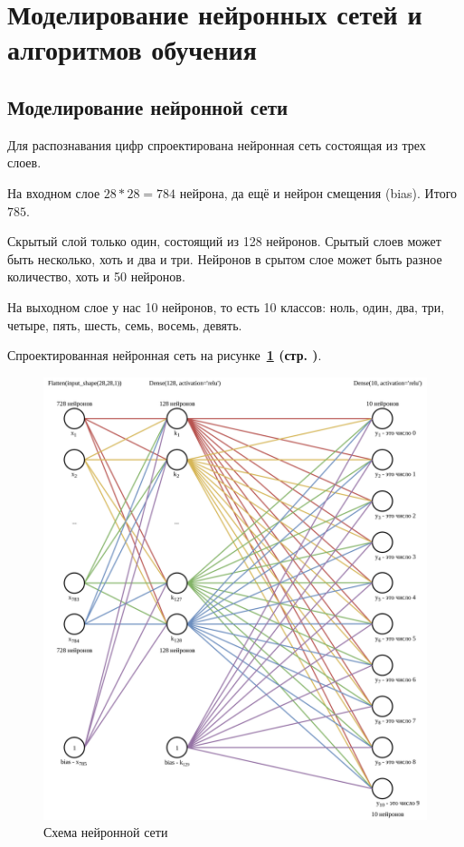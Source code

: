 \section{Моделирование нейронных сетей и алгоритмов обучения}

\subsection{Моделирование нейронной сети}

Для распознавания цифр спроектирована нейронная сеть состоящая из трех слоев.

На входном слое $28 * 28 = 784$ нейрона, да ещё и нейрон смещения (bias). Итого $785$.

Скрытый слой только один, состоящий из 128 нейронов. Срытый слоев может быть несколько, хоть и два и три. Нейронов в срытом слое может быть разное количество, хоть и 50 нейронов.

На выходном слое у нас 10 нейронов, то есть 10 классов: ноль, один, два, три, четыре, пять, шесть, семь, восемь, девять.

Спроектированная нейронная сеть на
рисунке~\textbf{\ref{fig:3_NNDiagram} (стр. \pageref{fig:3_NNDiagram})}.

\begin{figure}[p]
    \centering
    \includegraphics[width=16cm]
    {../src/digits/NNDiagram.png}
    \caption{Схема нейронной сети}
    \label{fig:3_NNDiagram}
\end{figure}

